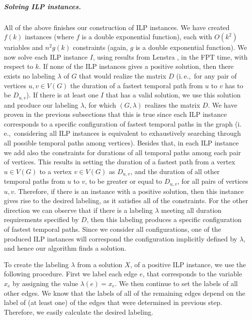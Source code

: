 \documentclass[a4paper,UKenglish,cleveref, autoref, thm-restate,anonymous]{lipics-v2021}
\newcommand{\ie}{i.\,e.,\ }
\begin{document}
\subparagraph{Solving ILP instances.}
All of the above finishes our construction of ILP instances.
We have created $f(k)$ instances (where $f$ is a double exponential function), 
each with $O(k^2)$ variables and $n^2 g(k)$ constraints (again, $g$ is a double exponential function).
We now solve each ILP instance $I$, using results from Lenstra \cite{Lenstra1983Integer},
in the FPT time, with respect to $k$.
%
If none of the ILP instances gives a positive solution, then there exists no labeling $\lambda$ of $G$ that would realize the matrix $D$ (\ie for any pair of vertices $u,v \in V(G)$ the duration of a fastest temporal path from $u$ to $v$ has to be $D_{u,v}$).
If there is at least one $I$ that has a valid solution, 
we use this solution and produce our labeling $\lambda$, for which $(G,\lambda)$ realizes the matrix $D$.
We have proven in the previous subsections that this is true since each ILP instance corresponds to a specific configuration of fastest temporal paths in the graph (\ie considering all ILP instances is equivalent to exhaustively searching through all possible temporal paths among vertices).
Besides that, in each ILP instance we add also the constraints for durations of all temporal paths among each pair of vertices.
This results in setting the duration of a fastest path from a vertex $u \in V(G)$ to a vertex $v \in V(G)$ as $D_{u,v}$,
and the duration of all other temporal paths from $u$ to $v$, to be greater or equal to $D_{u,v}$,
for all pairs of vertices $u,v$.
Therefore, if there is an instance with a positive solution, then this instance gives rise to the desired labeling, as it satisfies all of the constraints.
For the other direction we can observe that if there is a labeling $\lambda$ meeting all duration requirements specified by $D$, then this labeling produces a specific configuration of fastest temporal paths. Since we consider all configurations, one of the produced ILP instances will correspond the configuration implicitly defined by $\lambda$, and hence our algorithm finds a solution.

To create the labeling $\lambda$ from a solution $X$, of a positive ILP instance,
we use the following procedure.
First we
label each edge $e$, that corresponds to the variable $x_e$
by assigning the value $\lambda(e) = x_e$.
We then continue to set the labels of all other edges. 
We know that the labels of all of the remaining edges depend on the label of (at least one) of the edges that were determined in previous step. 
Therefore, we easily calculate the desired labeling.
\end{document}
